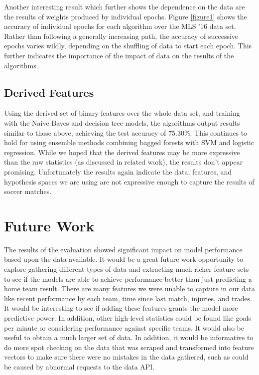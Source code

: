 Another interesting result which further shows the dependence on the data are the results of weights produced by individual epochs. Figure \ref{figure1} shows the accuracy of individual epochs for each algorithm over the MLS '16 data set. Rather than following a generally increasing path, the accuracy of successive epochs varies wildly, depending on the shuffling of data to start each epoch. This further indicates the importance of the impact of data on the results of the algorithms. 

\subsection{Derived Features}
Using the derived set of binary features over the whole data set, and training with the Naive Bayes and decision tree models, the algorithms output results similar to those above, achieving the test accuracy of 75.30\%. This continues to hold for using ensemble methods combining bagged forests with SVM and logistic regression. While we hoped that the derived features may be more expressive than the raw statistics (as discussed in related work), the results don't appear promising. Unfortunately the results again indicate the data, features, and hypothesis spaces we are using are not expressive enough to capture the results of soccer matches.

\section{Future Work}
The results of the evaluation showed significant impact on model performance based upon the data available. It would be a great future work opportunity to explore gathering different types of data and extracting much richer feature sets to see if the models are able to achieve performance better than just predicting a home team result. There are many features we were unable to capture in our data like recent performance by each team, time since last match, injuries, and trades. It would be interesting to see if adding these features grants the model more predictive power. In addition, other high-level statistics could be found like goals per minute or considering performance against specific teams. It would also be useful to obtain a much larger set of data. In addition, it would be informative to do more spot checking on the data that was scraped and transformed into feature vectors to make sure there were no mistakes in the data gathered, such as could be caused by abnormal requests to the data API.

